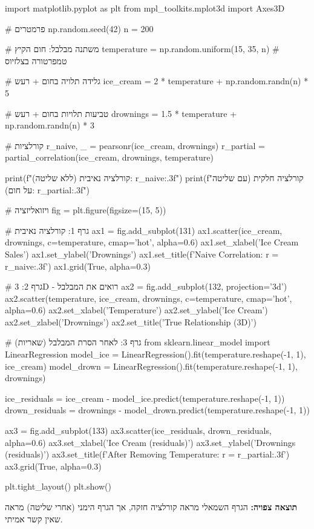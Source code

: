 \begin{pythonbox}
import matplotlib.pyplot as plt
from mpl_toolkits.mplot3d import Axes3D

# פרמטרים
np.random.seed(42)
n = 200

# משתנה מבלבל: חום הקיץ
temperature = np.random.uniform(15, 35, n)  # טמפרטורה בצלזיוס

# גלידה תלויה בחום + רעש
ice_cream = 2 * temperature + np.random.randn(n) * 5

# טביעות תלויות בחום + רעש
drownings = 1.5 * temperature + np.random.randn(n) * 3

# קורלציות
r_naive, _ = pearsonr(ice_cream, drownings)
r_partial = partial_correlation(ice_cream, drownings, temperature)

print(f"קורלציה נאיבית (ללא שליטה): {r_naive:.3f}")
print(f"קורלציה חלקית (עם שליטה על חום): {r_partial:.3f}")

# ויזואליזציה
fig = plt.figure(figsize=(15, 5))

# גרף 1: קורלציה נאיבית
ax1 = fig.add_subplot(131)
ax1.scatter(ice_cream, drownings, c=temperature, cmap='hot', alpha=0.6)
ax1.set_xlabel('Ice Cream Sales')
ax1.set_ylabel('Drownings')
ax1.set_title(f'Naive Correlation: r = {r_naive:.3f}')
ax1.grid(True, alpha=0.3)

# גרף 2: 3D - רואים את המבלבל
ax2 = fig.add_subplot(132, projection='3d')
ax2.scatter(temperature, ice_cream, drownings, c=temperature, cmap='hot', alpha=0.6)
ax2.set_xlabel('Temperature')
ax2.set_ylabel('Ice Cream')
ax2.set_zlabel('Drownings')
ax2.set_title('True Relationship (3D)')

# גרף 3: לאחר הסרת המבלבל (שאריות)
from sklearn.linear_model import LinearRegression
model_ice = LinearRegression().fit(temperature.reshape(-1, 1), ice_cream)
model_drown = LinearRegression().fit(temperature.reshape(-1, 1), drownings)

ice_residuals = ice_cream - model_ice.predict(temperature.reshape(-1, 1))
drown_residuals = drownings - model_drown.predict(temperature.reshape(-1, 1))

ax3 = fig.add_subplot(133)
ax3.scatter(ice_residuals, drown_residuals, alpha=0.6)
ax3.set_xlabel('Ice Cream (residuals)')
ax3.set_ylabel('Drownings (residuals)')
ax3.set_title(f'After Removing Temperature: r = {r_partial:.3f}')
ax3.grid(True, alpha=0.3)

plt.tight_layout()
plt.show()
\end{pythonbox}

\textbf{תוצאה צפויה:} הגרף השמאלי מראה קורלציה חזקה, אך הגרף הימני (אחרי שליטה) מראה שאין קשר אמיתי.

